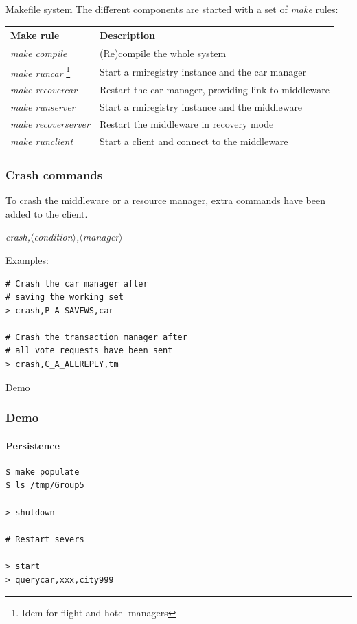 \documentclass{beamer}
\begin{document}
\begin{frame}{Makefile system}
  The different components are started with a set of {\it make} rules:

  \small{
    \begin{tabular}{l p{7cm}}
      Make rule & Description \\
      \hline
      {\it make compile} & (Re)compile the whole system \\
      {\it make runcar} \footnote{Idem for flight and hotel managers} & Start a rmiregistry instance and the car manager \\
      {\it make recovercar} & Restart the car manager, providing link to middleware \\
      {\it make runserver} & Start a rmiregistry instance and the middleware \\
      {\it make recoverserver} & Restart the middleware in recovery mode \\
      {\it make runclient } & Start a client and connect to the middleware
    \end{tabular}
  }
\end{frame}


\begin{frame}[t,fragile]
  \frametitle{Crash commands}
  To crash the middleware or a resource manager, extra commands have
  been added to the client.

  {\it crash,$\langle$condition$\rangle$,$\langle$manager$\rangle$}

  Examples:

\begin{verbatim}
# Crash the car manager after
# saving the working set
> crash,P_A_SAVEWS,car

# Crash the transaction manager after
# all vote requests have been sent
> crash,C_A_ALLREPLY,tm
\end{verbatim}
\end{frame}



\begin{frame}
  \Huge{Demo}
\end{frame}


\begin{frame}[fragile,t]
  \frametitle{Demo}
  \framesubtitle{Persistence}

\begin{verbatim}
$ make populate
$ ls /tmp/Group5

> shutdown

# Restart severs

> start
> querycar,xxx,city999
\end{verbatim}
\end{frame}
\end{document}
